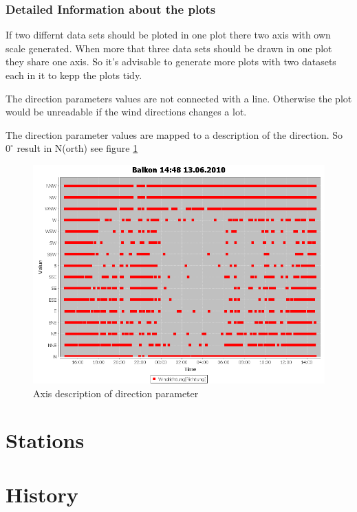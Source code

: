 
\subsubsection{Detailed Information about the plots} %
\label{ssub:detailed_information_about_the_plots}
If two differnt data sets should be ploted in one plot there two axis with own scale generated. When more that three data sets should be drawn in one plot they share one axis. So it's advisable to generate more plots with two datasets each in it to kepp the plots tidy.

The direction parameters values are not connected with a line. Otherwise the plot would be unreadable if the wind directions changes a lot.

The direction parameter values are mapped to a description of the direction. So $0^\circ$ result in N(orth) see figure \ref{fig:dir}
\begin{figure}[ht]
    \centering
    \includegraphics[width=0.9\linewidth]{master/plot_dir.png}
    \caption{Axis description of direction parameter}
    \label{fig:dir}
\end{figure}

\section{Stations} %
\label{sec:stations}


\section{History} %
\label{sec:history}

